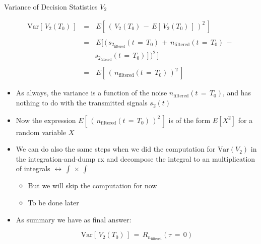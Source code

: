\documentclass{Beamer}
\begin{document}
\begin{frame}[t,allowframebreaks]{Variance of Decision Statistics $V_2$}

\begin{equation*}
\begin{array}{rcl}
\text{Var}[\,V_2(T_0)  \,] \, &=& \, E \left[\, (\, V_2(T_0) \, - \,  E[\,V_2(T_0)  \,]  \,)^2 \,\right] \\ \\
 &=& \, E [\, (\, s_{2_{\text{filtered}}}(t \, = \, T_0) \, + \, n_{\text{filtered}}(t \, = \, T_0) \, - \, \\ 
 && s_{2_{\text{filtered}}}(t \, = \, T_0)\,]  \,)^2 \,] \\ \\
  &=& \,   E \left[\, (\, n_{\text{filtered}}(t \, = \, T_0) \,)^2 \,\right] 
\end{array}
\end{equation*}

\begin{itemize}
\item  As always, the variance is a function of the noise $n_{\text{filtered}}(t \, = \, T_0)$, and has nothing to do with the transmitted signals $s_2(t)$

\item Now the expression $ E \left[\, (\, n_{\text{filtered}}(t \, = \, T_0) \,)^2 \,\right]$ is of the form $E[X^2]$ for a random variable $X$

\item We can do also the same steps when we did the computation for $\text{Var}(V_2)$ in the integration-and-dump rx and decompose the integral to an multiplication of integrals  $\leftrightarrow \, \displaystyle\int \, \times \,\displaystyle\int$

	\begin{itemize}
	\item But we will skip the computation for now
	\item To be done later
	\end{itemize}

\item As summary we have as final answer:

\begin{equation}
\text{Var}[\,V_2(T_0)  \,] \, = \,R_{n_{\text{filtered}}} (\tau \, = \, 0)
\end{equation}

\end{itemize}



\end{frame}
\end{document}
